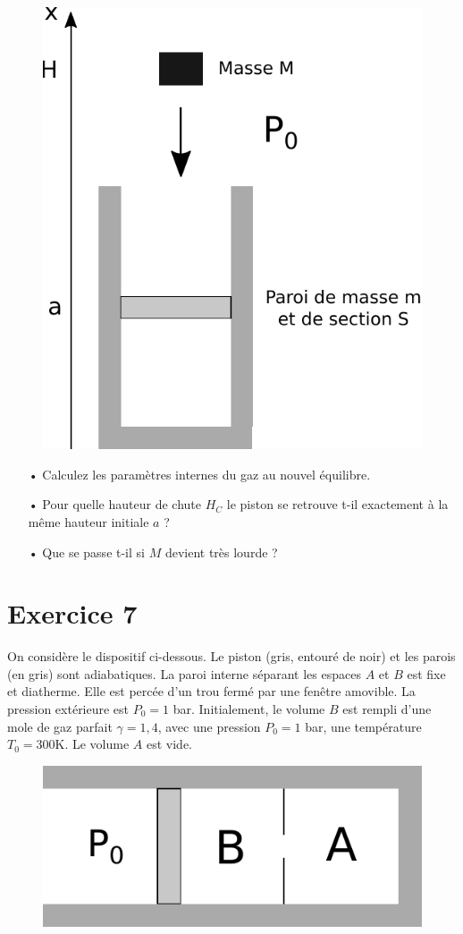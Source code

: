 \documentclass{report}
\begin{document}
\begin{figure}[!h]
\centering
\includegraphics[width=0.5\linewidth]{thermo4.pdf}
\end{figure}

\begin{itemize}
\item[•] Calculez les paramètres internes du gaz au nouvel équilibre. 
\item[•] Pour quelle hauteur de chute $H_C$ le piston se retrouve t-il exactement à la même hauteur initiale $a$ ?
\item[•] Que se passe t-il si $M$ devient très lourde ?
\end{itemize}

\newpage

\section*{Exercice 7}

On considère le dispositif ci-dessous. Le piston (gris, entouré de noir) et les parois (en gris) sont adiabatiques. La paroi interne séparant les espaces $A$ et $B$ est fixe et diatherme. Elle est percée d'un trou fermé par une fenêtre amovible. La pression extérieure est $P_0=1$ bar. Initialement, le volume $B$ est rempli d'une mole de gaz parfait $\gamma=1,4$, avec une pression $P_0=1$ bar, une température $T_0=300$K. Le volume $A$ est vide.

\begin{figure}[!h]
\centering
\includegraphics[width=0.5\linewidth]{thermo1.pdf}
\end{figure}
\end{document}
